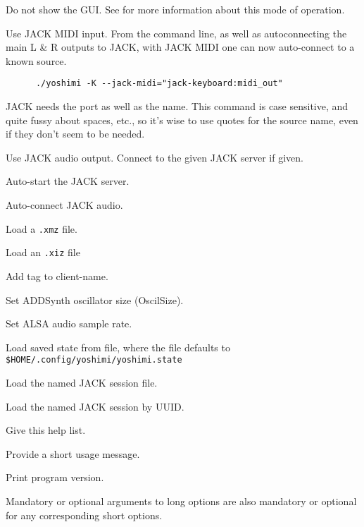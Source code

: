       Do not show the GUI.  See  for more
      information about this mode of operation.

      Use JACK MIDI input.
      From the command line, as well as autoconnecting the main L \& R
      outputs to JACK, with JACK MIDI one can now auto-connect to a known source.

   \begin{verbatim}
      ./yoshimi -K --jack-midi="jack-keyboard:midi_out"
   \end{verbatim}
   
   JACK needs the port as well as the name.
   This command is case sensitive, and quite fussy about spaces, etc.,
   so it's wise to use quotes for the source name, even if they don't seem to
   be needed.

      Use JACK audio output.
      Connect to the given JACK server if given.

      Auto-start the JACK server.

      Auto-connect JACK audio.

      Load a \texttt{.xmz} file.

      Load an \texttt{.xiz} file

      Add tag to client-name.

      Set ADDSynth oscillator size (OscilSize).

      Set ALSA audio sample rate.

      Load saved state from file, where the file defaults to
      \texttt{\$HOME/.config/yoshimi/yoshimi.state}

      Load the named JACK session file.

      Load the named JACK session by UUID.

      Give this help list.

      Provide a short usage message.

      Print program version.

   Mandatory or optional arguments to long options are also mandatory or
   optional for any corresponding short options.


